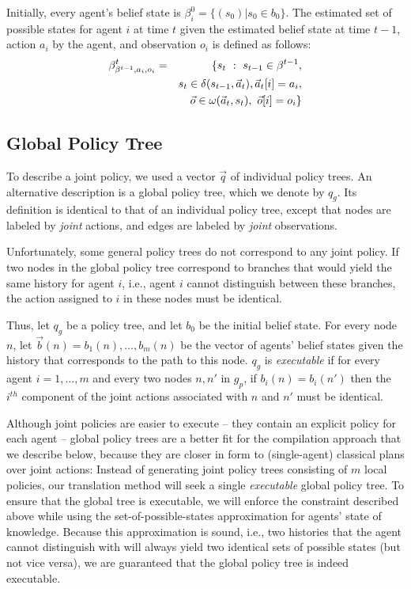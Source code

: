 \documentclass[letterpaper]{article}
\theoremstyle{definition}
\begin{document}
Initially, every agent's belief state is $\beta_i^0 = \{(s_0) | s_0 \in b_0\}$.  The estimated set of possible states for agent $i$ at time $t$ given the estimated belief state at time $t-1$, action $a_i$ by the agent, and observation $o_i$
is defined as follows: \\[-12pt]

\begin{eqnarray}
\scriptsize
\beta^t_{\beta^{t-1},a_i,o_i} &=& \{ s_{t}~: ~s_{t-1}\in\beta^{t-1},\\ \nonumber
   && s_{t}\in\delta(s_{t-1},\vec{a}_t), \vec{a}_t[i] = a_i,\\ \nonumber
    &&\vec{o} \in \omega(\vec{a}_t,s_{t}), ~\vec{o}[i] = o_i\}
 \end{eqnarray}

\subsection{Global Policy Tree}
To describe a joint policy, we used a vector $\vec{q}$ of individual policy trees. An alternative description is a global policy tree,
which we denote by $q_g$. Its definition is identical to that of an individual policy tree, except that nodes are labeled by {\em joint} actions, and edges are labeled by {\em joint} observations.

Unfortunately, some general policy trees do not correspond to any joint policy. If two nodes in the global policy tree correspond to branches
that would yield the same history for agent $i$, i.e., agent $i$ cannot distinguish between these branches, the action assigned to $i$ in these
nodes must be identical.

Thus, let $q_g$ be a policy tree, and let $b_0$ be the initial belief state. For every node $n$, let $\vec{b}(n)= b_1(n),\ldots,b_m(n)$ be the
vector of agents' belief states given the history that corresponds to the path to this node. $q_g$ is {\em executable} if for every agent $i=1,\ldots, m$ and every two nodes $n,n'$ in $g_p$, if $b_i(n)=b_i(n')$ then the $i^{th}$ component of the joint actions associated with $n$ and $n'$ must be identical.

Although joint policies are easier to execute -- they contain an explicit policy for each agent -- global policy trees are a better fit for
the compilation approach that we describe below, because they are closer in form to (single-agent) classical plans over joint actions:
Instead of generating joint policy trees consisting of $m$ local policies, our translation method will seek a single {\em executable\/} global policy tree. To ensure that the global tree is executable, we will enforce the constraint described above
while using the set-of-possible-states approximation for agents' state of knowledge.
Because this approximation is sound, i.e., two histories that the agent cannot distinguish with will always
yield two identical sets of possible states (but not vice versa), we are guaranteed that the global policy tree is indeed executable.
\end{document}
